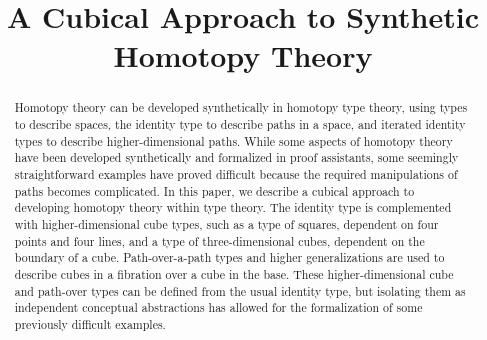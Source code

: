 \documentclass[10pt, conference, compsocconf]{drl-common/IEEEtran}
\begin{document}
\title{A Cubical Approach to Synthetic Homotopy Theory}

\author{
\and
{}

}

\maketitle

\begin{abstract}
Homotopy theory can be developed synthetically in homotopy type theory,
using types to describe spaces, the identity type to describe paths in a
space, and iterated identity types to describe higher-dimensional paths.
While some aspects of homotopy theory have been developed synthetically
and formalized in proof assistants, some seemingly straightforward
examples have proved difficult because the required manipulations of
paths becomes complicated.  In this paper, we describe a cubical
approach to developing homotopy theory within type theory.  The identity
type is complemented with higher-dimensional cube types, such as a type
of squares, dependent on four points and four lines, and a type of
three-dimensional cubes, dependent on the boundary of a cube.
Path-over-a-path types and higher generalizations are used to describe
cubes in a fibration over a cube in the base.  These higher-dimensional
cube and path-over types can be defined from the usual identity type,
but isolating them as independent conceptual abstractions has allowed
for the formalization of some previously difficult examples.
\end{abstract}
\end{document}
